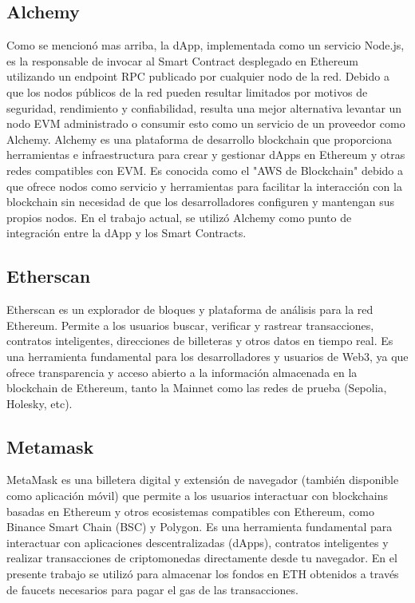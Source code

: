 \subsection{Alchemy}

Como se mencionó mas arriba, la dApp, implementada como un servicio Node.js, es la responsable de invocar al Smart Contract desplegado en Ethereum utilizando un endpoint RPC publicado por cualquier nodo de la red. Debido a que los nodos públicos de la red pueden resultar limitados por motivos de seguridad, rendimiento y confiabilidad, resulta una mejor alternativa levantar un nodo EVM administrado o consumir esto como un servicio de un proveedor como Alchemy. Alchemy \cite{alchemy_website} es una plataforma de desarrollo blockchain que proporciona herramientas e infraestructura para crear y gestionar dApps en Ethereum y otras redes compatibles con EVM. Es conocida como el "AWS de Blockchain" debido a que ofrece nodos como servicio y herramientas para facilitar la interacción con la blockchain sin necesidad de que los desarrolladores configuren y mantengan sus propios nodos. En el trabajo actual, se utilizó Alchemy como punto de integración entre la dApp y los Smart Contracts.

\subsection{Etherscan}

Etherscan \cite{etherscan} es un explorador de bloques y plataforma de análisis para la red Ethereum. Permite a los usuarios buscar, verificar y rastrear transacciones, contratos inteligentes, direcciones de billeteras y otros datos en tiempo real. Es una herramienta fundamental para los desarrolladores y usuarios de Web3, ya que ofrece transparencia y acceso abierto a la información almacenada en la blockchain de Ethereum, tanto la Mainnet como las redes de prueba (Sepolia, Holesky, etc).

\subsection{Metamask}

MetaMask \cite{metamask} es una billetera digital y extensión de navegador (también disponible como aplicación móvil) que permite a los usuarios interactuar con blockchains basadas en Ethereum y otros ecosistemas compatibles con Ethereum, como Binance Smart Chain (BSC) y Polygon. Es una herramienta fundamental para interactuar con aplicaciones descentralizadas (dApps), contratos inteligentes y realizar transacciones de criptomonedas directamente desde tu navegador.
En el presente trabajo se utilizó para almacenar los fondos en ETH obtenidos a través de faucets necesarios para pagar el gas de las transacciones.

